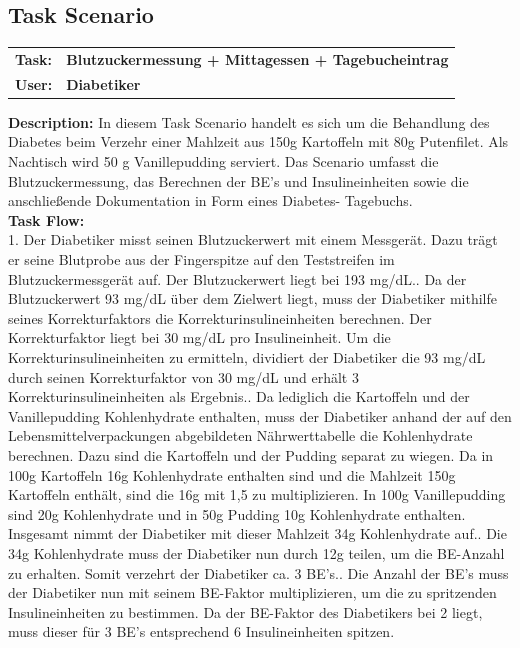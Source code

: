 \subsection{Task Scenario}
\begin{center}
	\begin{longtable}[H]{p{2cm}p{12cm}}
		\textbf{Task: }& \textbf{Blutzuckermessung + Mittagessen + Tagebucheintrag} \\
		 \textbf{User: } & \textbf{Diabetiker}
	\end{longtable}
\end{center}
\textbf{Description: } In diesem Task Scenario handelt es sich um die Behandlung des Diabetes beim Verzehr einer Mahlzeit aus 150g Kartoffeln mit 80g Putenfilet. Als Nachtisch wird 50 g Vanillepudding serviert. Das Scenario umfasst die Blutzuckermessung, das Berechnen der BE’s und Insulineinheiten sowie die anschließende Dokumentation in Form eines Diabetes- Tagebuchs.\\
\textbf{Task Flow:}\\
1. Der Diabetiker misst seinen Blutzuckerwert mit einem Messgerät. Dazu trägt er seine Blutprobe aus der Fingerspitze auf den Teststreifen im Blutzuckermessgerät auf. Der Blutzuckerwert liegt bei 193 mg/dL.. Da der Blutzuckerwert 93 mg/dL über dem Zielwert liegt, muss der Diabetiker mithilfe seines Korrekturfaktors die Korrekturinsulineinheiten berechnen. Der Korrekturfaktor liegt bei 30 mg/dL pro Insulineinheit. Um die Korrekturinsulineinheiten zu ermitteln, dividiert der Diabetiker die 93 mg/dL durch seinen Korrekturfaktor von 30 mg/dL und erhält 3 Korrekturinsulineinheiten als Ergebnis.. Da lediglich die Kartoffeln und der Vanillepudding Kohlenhydrate enthalten, muss der Diabetiker anhand der auf den Lebensmittelverpackungen abgebildeten Nährwerttabelle die Kohlenhydrate berechnen. Dazu sind die Kartoffeln und der Pudding separat zu wiegen. Da in 100g Kartoffeln 16g Kohlenhydrate enthalten sind und die Mahlzeit 150g Kartoffeln enthält, sind die 16g mit 1,5 zu multiplizieren. In 100g Vanillepudding sind 20g Kohlenhydrate und in 50g Pudding 10g Kohlenhydrate enthalten. Insgesamt nimmt der Diabetiker mit dieser Mahlzeit 34g Kohlenhydrate auf.. Die 34g Kohlenhydrate muss der Diabetiker nun durch 12g teilen, um die BE-Anzahl zu erhalten. Somit verzehrt der Diabetiker ca. 3 BE’s.. Die Anzahl der BE’s muss der Diabetiker nun mit seinem BE-Faktor multiplizieren, um die zu spritzenden Insulineinheiten zu bestimmen. Da der BE-Faktor des Diabetikers bei 2 liegt, muss dieser für 3 BE’s entsprechend 6 Insulineinheiten spitzen.\newline
